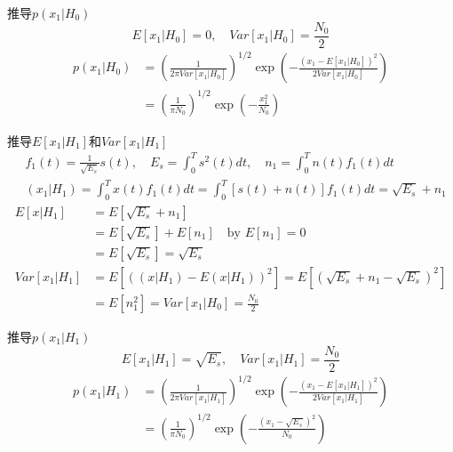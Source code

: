 \begin{frame}{推导$p(x_1|H_0)$}
\[ E[x_1|H_0]=0,\quad Var[x_1|H_0]=\frac{N_0}{2}\]
\begin{align*}
p(x_1|H_0)&=\left(\frac{1}{2\pi Var[x_1|H_0]}\right)^{1/2}\exp\left(-\frac{(x_1-E[x_1|H_0])^2}{2Var[x_1|H_0]}\right)\\
&=\left(\frac{1}{\pi N_0}\right)^{1/2}\exp\left(-\frac{x_1^2}{N_0}\right)
\end{align*}
\end{frame}

\begin{frame}{推导$E[x_1|H_1]$和$Var[x_1|H_1]$}
\begin{align*}
&f_1(t)=\frac{1}{\sqrt{E_s}}s(t),\quad E_s=\int_{0}^{T}s^2(t)dt, \quad n_1=\int_{0}^{T}n(t)f_1(t)dt\\
&(x_1|H_1)=\int_{0}^{T}x(t)f_1(t)dt=\int_{0}^{T}[s(t)+n(t)]f_1(t)dt=\sqrt{E_s}+n_1
\end{align*}
\begin{align*}
E[x|H_1]&=E\left[\sqrt{E_s}+n_1\right]\\
&=E[\sqrt{E_s}]+E[n_1]\quad\text{by } E[n_1]=0\\
&=E[\sqrt{E_s}]=\sqrt{E_s}\\
Var[x_1|H_1]&=E[((x|H_1)-E(x|H_1))^2]=E\left[\left(\sqrt{E_s}+n_1-\sqrt{E_s}\right)^2\right]\\
&=E[n_1^2]=Var[x_1|H_0]=\frac{N_0}{2}
\end{align*}
\end{frame}

\begin{frame}{推导$p(x_1|H_1)$}
\[ E[x_1|H_1]=\sqrt{E_s},\quad Var[x_1|H_1]=\frac{N_0}{2}\]
\begin{align*}
p(x_1|H_1)&=\left(\frac{1}{2\pi Var[x_1|H_1]}\right)^{1/2}\exp\left(-\frac{(x_1-E[x_1|H_1])^2}{2Var[x_1|H_1]}\right)\\
&=\left(\frac{1}{\pi N_0}\right)^{1/2}\exp\left(-\frac{(x_1-\sqrt{E_s})^2}{N_0}\right)
\end{align*}
\end{frame}


